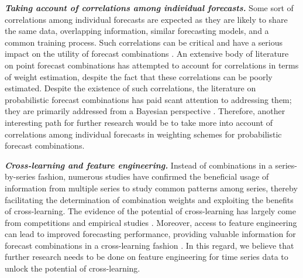 \documentclass[a4paper,11pt]{article}
\begin{document}
\textbf{\textit{Taking account of correlations among individual forecasts.}} Some sort of correlations among individual forecasts are expected as they are likely to share the same data, overlapping information, similar forecasting models, and a common training process. Such correlations can be critical and have a serious impact on the utility of forecast combinations \citep{De_Menezes2000-vd}. An extensive body of literature on point forecast combinations has attempted to account for correlations in terms of weight estimation, despite the fact that these correlations can be poorly estimated. Despite the existence of such correlations, the literature on probabilistic forecast combinations has paid scant attention to addressing them; they are primarily addressed from a Bayesian perspective \citep[e.g.,][]{Winkler1981-bn,McAlinn2019-kn}. Therefore, another interesting path for further research would be to take more into account of correlations among individual forecasts in weighting schemes for probabilistic forecast combinations.

\textbf{\textit{Cross-learning and feature engineering.}} Instead of combinations in a series-by-series fashion, numerous studies have confirmed the beneficial usage of information from multiple series to study common patterns among series, thereby facilitating the determination of combination weights and exploiting the benefits of cross-learning. The evidence of the potential of cross-learning has largely come from competitions \citep[e.g.,][]{Makridakis2020-hu,Makridakis2020-fn} and empirical studies \citep[e.g.,][]{Ma2021-np}. Moreover, access to feature engineering can lead to improved forecasting performance, providing valuable information for forecast combinations in a cross-learning fashion \citep{Montero-Manso2020-tq,Kang2021-ol}. In this regard, we believe that further research needs to be done on feature engineering for time series data to unlock the potential of cross-learning.
\end{document}

